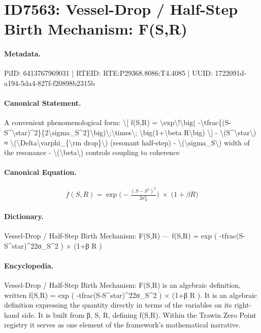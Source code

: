 \section*{ID7563: Vessel-Drop / Half-Step Birth Mechanism: F(S,R)}
\paragraph{Metadata.}
PiID: 6413767969031 | RTEID: RTE:P29368.8086:T4.4085 | UUID: 1722091d-a194-5da4-827f-f20898b2315b

\paragraph{Canonical Statement.}
A convenient phenomenological form: \textbackslash{}[ f(S,R) = \textbackslash{}exp\textbackslash{}!\textbackslash{}big( -\textbackslash{}tfrac\{(S-S\textasciicircum{}\textbackslash{}star)\textasciicircum{}2\}\{2\textbackslash{}sigma\_S\textasciicircum{}2\}\textbackslash{}big)\textbackslash{};\textbackslash{}times\textbackslash{}; \textbackslash{}big(1+\textbackslash{}beta R\textbackslash{}big) \textbackslash{}] - \textbackslash{}(S\textasciicircum{}\textbackslash{}star\textbackslash{}) ≈ \textbackslash{}(\textbackslash{}Delta\textbackslash{}varphi\_\{\textbackslash{}rm drop\}\textbackslash{}) (resonant half-step) - \textbackslash{}(\textbackslash{}sigma\_S\textbackslash{}) width of the resonance - \textbackslash{}(\textbackslash{}beta\textbackslash{}) controls coupling to coherence

\paragraph{Canonical Equation.}
\[
f(S,R) = \exp\!\big( -\tfrac{(S-S^\star)^2}{2\sigma_S^2}\big)\;\times\; \big(1+\beta R\big)
\]

\paragraph{Dictionary.}
Vessel-Drop / Half-Step Birth Mechanism: F(S,R) — f(S,R) = exp ( -tfrac(S-S\textasciicircum{}star)\textasciicircum{}22σ\_S\textasciicircum{}2 ) × (1+β R )

\paragraph{Encyclopedia.}
Vessel-Drop / Half-Step Birth Mechanism: F(S,R) is an algebraic definition, written f(S,R) = exp ( -tfrac(S-S\textasciicircum{}star)\textasciicircum{}22σ\_S\textasciicircum{}2 ) × (1+β R ). It is an algebraic definition expressing the quantity directly in terms of the variables on its right-hand side. It is built from β, S, R, defining f(S,R). Within the Trawin Zero Point registry it serves as one element of the framework's mathematical narrative.
